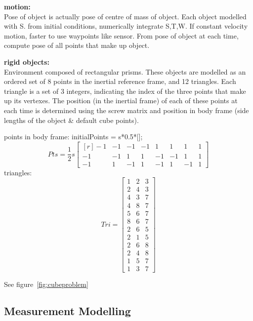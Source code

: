\textbf{motion:}\\
Pose of object is actually pose of centre of mass of object.
Each object modelled with S. from initial conditions, numerically integrate S,T,W. If constant velocity motion, faster to use waypoints like sensor.
From pose of object at each time, compute pose of all points that make up object.

\textbf{rigid objects:}\\
Environment composed of rectangular prisms. These objects are modelled as an ordered set of 8 points in the inertial reference frame, and 12 triangles. Each triangle is a set of 3 integers, indicating the index of the three points that make up its vertexes.
The position (in the inertial frame) of each of these points at each time is determined using the screw matrix and position in body frame (side lengths of the object \& default cube points).

points in body frame:
initialPoints = s*0.5*[];
\begin{equation}
	Pts = \frac{1}{2}s
	\begin{bmatrix*}[r]
		-1  &  -1  &  -1  &  -1  &   1  &   1  &   1  &  1 \\
		-1  &  -1  &   1  &   1  &  -1  &  -1  &   1  &  1 \\
		-1  &   1  &  -1  &   1  &  -1  &   1  &  -1  &  1 
	\end{bmatrix*}
\end{equation}
triangles:
\begin{equation}
	Tri = 
	\begin{bmatrix}
	1 & 2 & 3 \\
	2 & 4 & 3 \\
    4 & 3 & 7 \\
    4 & 8 & 7 \\
    5 & 6 & 7 \\
    8 & 6 & 7 \\
    2 & 6 & 5 \\
    2 & 1 & 5 \\
    2 & 6 & 8 \\
    2 & 4 & 8 \\
    1 & 5 & 7 \\
    1 & 3 & 7
	\end{bmatrix}
\end{equation}

See figure~\ref{fig:cubeproblem}


\subsection{Measurement Modelling}

